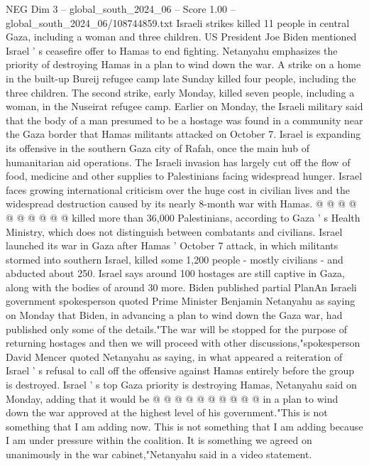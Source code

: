 \begin{textsample}{NEG Dim 3 – global\_south\_2024\_06 – Score 1.00 – global\_south\_2024\_06/108744859.txt}  \label{ex:f3_neg_119}
Israeli strikes killed 11 people in central Gaza, including a woman and three children.
US President Joe Biden mentioned Israel ' s ceasefire offer to Hamas to end fighting.
Netanyahu emphasizes the priority of destroying Hamas in a plan to wind down the war.
A strike on a home in the built-up Bureij refugee camp late Sunday killed four people, including the three children.
The second strike, early Monday, killed seven people, including a woman, in the Nuseirat refugee camp.
Earlier on Monday, the Israeli military said that the body of a man presumed to be a hostage was found in a community near the Gaza border that Hamas militants attacked on October 7.
Israel is expanding its offensive in the southern Gaza city of Rafah, once the main hub of humanitarian aid operations.
The Israeli invasion has largely cut off the flow of food, medicine and other supplies to Palestinians facing widespread hunger.
Israel faces growing international criticism over the huge cost in civilian lives and the widespread destruction caused by its nearly 8-month war with Hamas. @ @ @ @ @ @ @ @ @ @ killed more than 36,000 Palestinians, according to Gaza ' s Health Ministry, which does not distinguish between combatants and civilians.
Israel launched its war in Gaza after Hamas ' October 7 attack, in which militants stormed into southern Israel, killed some 1,200 people - mostly civilians - and abducted about 250.
Israel says around 100 hostages are still captive in Gaza, along with the bodies of around 30 more.
Biden published partial PlanAn Israeli government spokesperson quoted Prime Minister Benjamin Netanyahu as saying on Monday that Biden, in advancing a plan to wind down the Gaza war, had published only some of the details."The war will be stopped for the purpose of returning hostages and then we will proceed with other discussions,"spokesperson David Mencer quoted Netanyahu as saying, in what appeared a reiteration of Israel ' s refusal to call off the offensive against Hamas entirely before the group is destroyed.
Israel ' s top Gaza priority is destroying Hamas, Netanyahu said on Monday, adding that it would be @ @ @ @ @ @ @ @ @ @ in a plan to wind down the war approved at the highest level of his government."This is not something that I am adding now.
This is not something that I am adding because I am under pressure within the coalition.
It is something we agreed on unanimously in the war cabinet,"Netanyahu said in a video statement.

\end{textsample}
